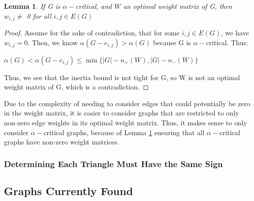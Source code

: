 \documentclass[12pt]{article}
\theoremstyle{parenbold}
\newtheorem{lemma}{Lemma}[section]
\begin{document}
\begin{lemma}
\label{alpha}
If G is $\alpha-$critical, and $W$ an optimal weight matrix of G, then $w_{i,j} \neq$ 0 for all $i,j \in E(G)$
\end{lemma} 
\begin{proof}
Assume for the sake of contradiction, that for some $i,j \in E(G)$, we have $w_{i,j} = 0$. Then, we know $\alpha(G-e_{i,j}) > \alpha(G)$ because G is $\alpha-$critical. Thus:

$\alpha(G) < \alpha(G-e_{i,j}) \leq \min\{|G| - n_+(W),|G| - n_-(W)\}$

Thus, we see that the inertia bound is not tight for G, so W is not an optimal weight matrix of G, which is a contradiction.
\end{proof}

Due to the complexity of needing to consider edges that could potentially be zero in the weight matrix, it is easier to consider graphs that are restricted to only non-zero edge weights in its optimal weight matrix. Thus, it makes sense to only consider $\alpha-$critical graphs, because of Lemma \ref{alpha} ensuring that all $\alpha-$critical graphs have non-zero weight matrices.

\subsubsection{Determining Each Triangle Must Have the Same Sign}


\subsection{Graphs Currently Found}
\end{document}
